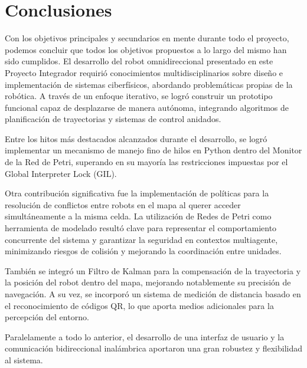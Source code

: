\chapter{Conclusiones}

Con los objetivos principales y secundarios en mente durante todo el proyecto, podemos concluir que todos los objetivos propuestos a lo largo del mismo han sido cumplidos. El desarrollo del robot omnidireccional presentado en este Proyecto Integrador requirió conocimientos multidisciplinarios sobre diseño e implementación de sistemas ciberfísicos, abordando problemáticas propias de la robótica. A través de un enfoque iterativo, se logró construir un prototipo funcional capaz de desplazarse de manera autónoma, integrando algoritmos de planificación de trayectorias y sistemas de control anidados.

Entre los hitos más destacados alcanzados durante el desarrollo, se logró implementar un mecanismo de manejo fino de hilos en Python dentro del Monitor de la Red de Petri, superando en su mayoría las restricciones impuestas por el Global Interpreter Lock (GIL).

Otra contribución significativa fue la implementación de políticas para la resolución de conflictos entre robots en el mapa al querer acceder simultáneamente a la misma celda. La utilización de Redes de Petri como herramienta de modelado resultó clave para representar el comportamiento concurrente del sistema y garantizar la seguridad en contextos multiagente, minimizando riesgos de colisión y mejorando la coordinación entre unidades.

También se integró un Filtro de Kalman para la compensación de la trayectoria y la posición del robot dentro del mapa, mejorando notablemente su precisión de navegación. A su vez, se incorporó un sistema de medición de distancia basado en el reconocimiento de códigos QR, lo que aporta medios adicionales para la percepción del entorno.

Paralelamente a todo lo anterior, el desarrollo de una interfaz de usuario y la comunicación bidireccional inalámbrica aportaron una gran robustez y flexibilidad al sistema.
